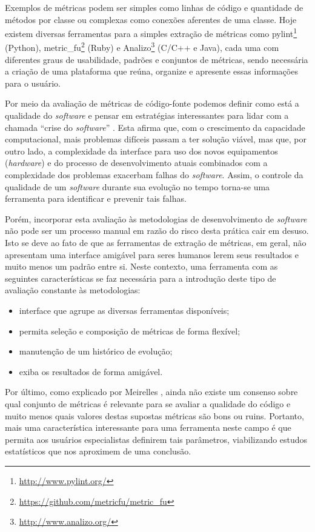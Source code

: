 \documentclass{llncs}
\begin{document}
Exemplos de métricas podem ser simples como linhas de código e quantidade de
métodos por classe ou complexas como conexões aferentes de uma classe.  Hoje
existem diversas ferramentas para a simples extração de métricas como
pylint\footnote{\url{http://www.pylint.org/}} (Python),
metric\_fu\footnote{\url{https://github.com/metricfu/metric_fu}} (Ruby) e
Analizo\footnote{\url{http://www.analizo.org/}} (C/C++ e Java), cada uma com
diferentes graus de usabilidade, padrões e conjuntos de métricas, sendo
necessária a criação de uma plataforma que reúna, organize e apresente essas
informações para o usuário.

Por meio da avaliação de métricas de código-fonte podemos definir como está a
qualidade do \textit{software} e pensar em estratégias interessantes para lidar
com a chamada ``crise do \textit{software}'' \cite{naur1969software}. Esta
afirma que, com o crescimento da capacidade computacional, mais problemas
difíceis passam a ter solução viável, mas que, por outro lado, a complexidade
da interface para uso dos novos equipamentos (\textit{hardware}) e do processo
de desenvolvimento atuais combinados com a complexidade dos problemas exacerbam
falhas do \textit{software}. Assim, o controle da qualidade de um
\textit{software} durante sua evolução no tempo torna-se uma ferramenta para
identificar e prevenir tais falhas.

Porém, incorporar esta avaliação às metodologias de desenvolvimento de
\textit{software} não pode ser um processo manual em razão do risco desta
prática cair em desuso. Isto se deve ao fato de que as ferramentas de extração
de métricas, em geral, não apresentam uma interface amigável para seres humanos
lerem seus resultados e muito menos um padrão entre si.  Neste contexto, uma
ferramenta com as seguintes características se faz necessária para a introdução
deste tipo de avaliação constante às metodologias:
\begin{itemize}
  \item interface que agrupe as diversas ferramentas disponíveis;
  \item permita seleção e composição de métricas de forma flexível;
  \item manutenção de um histórico de evolução;
  \item exiba os resultados de forma amigável.
\end{itemize}

Por último, como explicado por Meirelles \cite{meirelles2013monitoramento},
ainda não existe um consenso sobre qual conjunto de métricas é relevante para
se avaliar a qualidade do código e muito menos quais valores destas supostas
métricas são bons ou ruins. Portanto, mais uma característica interessante para
uma ferramenta neste campo é que permita aos usuários especialistas definirem
tais parâmetros, viabilizando estudos estatísticos que nos aproximem de uma
conclusão.
\end{document}

